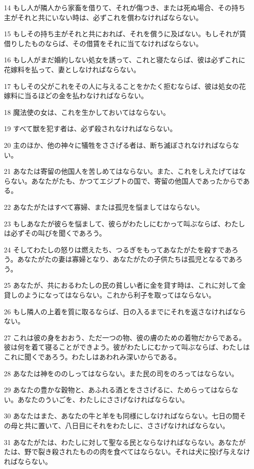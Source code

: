 \par 14 もし人が隣人から家畜を借りて、それが傷つき、または死ぬ場合、その持ち主がそれと共にいない時は、必ずこれを償わなければならない。
\par 15 もしその持ち主がそれと共におれば、それを償うに及ばない。もしそれが賃借りしたものならば、その借賃をそれに当てなければならない。
\par 16 もし人がまだ婚約しない処女を誘って、これと寝たならば、彼は必ずこれに花嫁料を払って、妻としなければならない。
\par 17 もしその父がこれをその人に与えることをかたく拒むならば、彼は処女の花嫁料に当るほどの金を払わなければならない。
\par 18 魔法使の女は、これを生かしておいてはならない。
\par 19 すべて獣を犯す者は、必ず殺されなければならない。
\par 20 主のほか、他の神々に犠牲をささげる者は、断ち滅ぼされなければならない。
\par 21 あなたは寄留の他国人を苦しめてはならない。また、これをしえたげてはならない。あなたがたも、かつてエジプトの国で、寄留の他国人であったからである。
\par 22 あなたがたはすべて寡婦、または孤児を悩ましてはならない。
\par 23 もしあなたが彼らを悩まして、彼らがわたしにむかって叫ぶならば、わたしは必ずその叫びを聞くであろう。
\par 24 そしてわたしの怒りは燃えたち、つるぎをもってあなたがたを殺すであろう。あなたがたの妻は寡婦となり、あなたがたの子供たちは孤児となるであろう。
\par 25 あなたが、共におるわたしの民の貧しい者に金を貸す時は、これに対して金貸しのようになってはならない。これから利子を取ってはならない。
\par 26 もし隣人の上着を質に取るならば、日の入るまでにそれを返さなければならない。
\par 27 これは彼の身をおおう、ただ一つの物、彼の膚のための着物だからである。彼は何を着て寝ることができよう。彼がわたしにむかって叫ぶならば、わたしはこれに聞くであろう。わたしはあわれみ深いからである。
\par 28 あなたは神をののしってはならない。また民の司をのろってはならない。
\par 29 あなたの豊かな穀物と、あふれる酒とをささげるに、ためらってはならない。あなたのういごを、わたしにささげなければならない。
\par 30 あなたはまた、あなたの牛と羊をも同様にしなければならない。七日の間その母と共に置いて、八日目にそれをわたしに、ささげなければならない。
\par 31 あなたがたは、わたしに対して聖なる民とならなければならない。あなたがたは、野で裂き殺されたものの肉を食べてはならない。それは犬に投げ与えなければならない。

